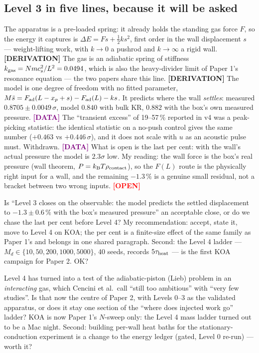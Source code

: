 \documentclass[11pt,a4paper]{article}
\newcommand{\kT}{k_{\mathrm B}T}
\newcommand{\dat}{\textcolor{Purple}{\textbf{[DATA]}}}
\newcommand{\der}{\textcolor{NavyBlue}{\textbf{[DERIVATION]}}}
\newcommand{\opn}{\textcolor{Red}{\textbf{[OPEN]}}}
\begin{document}
\subsection{Level 3 in five lines, because it will be asked}
\label{sec:l3}
The apparatus is a pre-loaded spring: it already holds the standing gas force $F$, so the energy it captures is $\Delta E = F s + \tfrac12 k s^2$, first order in the wall displacement $s$ --- weight-lifting work, with $k \to 0$ a pushrod and $k \to \infty$ a rigid wall. \der{}
The gas is an adiabatic spring of stiffness $k_{\rm gas} = N m c_s^2/L^2 = 0.0494$, which is also the heavy-divider limit of Paper 1's resonance equation --- the two papers share this line. \der{}
The model is one degree of freedom with no fitted parameter, $M\ddot s = F_{\rm ad}(L - x_p + s) - F_{\rm ad}(L) - ks$. It predicts where the wall \emph{settles}: measured $0.8705 \pm 0.0049\,\sigma$, model $0.840$ with bulk KR, $0.882$ with the box's own measured pressure. \dat{}
The ``transient excess'' of 19--57\,\% reported in v4 was a peak-picking statistic: the identical statistic on a no-push control gives the same number ($+0.463$ vs $+0.446\,\sigma$), and it does not scale with $u$ as an acoustic pulse must. Withdrawn. \dat{}
What is open is the last per cent: with the wall's actual pressure the model is $2.3\sigma$ low. My reading: the wall force is the box's real pressure (wall theorem, $P = \kT\rho_{\rm contact}$), so the $F(L)$ route is the physically right input for a wall, and the remaining $-1.3\,\%$ is a genuine small residual, not a bracket between two wrong inputs. \opn{}

\begin{ask}[Paper 2]
Is ``Level 3 closes on the observable: the model predicts the settled displacement to $-1.3 \pm 0.6\,\%$ with the box's measured pressure'' an acceptable close, or do we chase the last per cent before Level 4? My recommendation: accept, state it, move to Level 4 on KOA; the per cent is a finite-size effect of the same family as Paper 1's and belongs in one shared paragraph. Second: the Level 4 ladder --- $M_d \in \{10, 50, 200, 1000, 5000\}$, 40 seeds, records $5\tau_{\rm heat}$ --- is the first KOA campaign for Paper 2. OK?
\end{ask}

\begin{ask}
Level 4 has turned into a test of the adiabatic-piston (Lieb) problem in an \emph{interacting} gas, which Cencini et al.\ call ``still too ambitious'' with ``very few studies''. Is that now the centre of Paper 2, with Levels 0--3 as the validated apparatus, or does it stay one section of the ``where does injected work go'' ladder? KOA is now Paper 1's $N$-sweep only: the Level 4 mass ladder turned out to be a Mac night. Second: building per-wall heat baths for the stationary-conduction experiment is a change to the energy ledger (gated, Level 0 re-run) --- worth it?
\end{ask}
\end{document}
